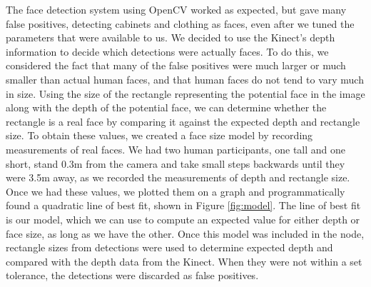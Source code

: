 \documentclass[conference]{IEEEtran}
\begin{document}
The face detection system using OpenCV worked as expected, but gave many false positives, detecting cabinets and clothing as faces, even after we tuned the parameters that were available to us. We decided to use the Kinect's depth information to decide which detections were actually faces. To do this, we considered the fact that many of the false positives were much larger or much smaller than actual human faces, and that human faces do not tend to vary much in size. Using the size of the rectangle representing the potential face in the image along with the depth of the potential face, we can determine whether the rectangle is a real face by comparing it against the expected depth and rectangle size. To obtain these values, we created a face size model by recording measurements of real faces. We had two human participants, one tall and one short, stand 0.3m from the camera and take small steps backwards until they were 3.5m away, as we recorded the measurements of depth and rectangle size. Once we had these values, we plotted them on a graph and programmatically found a quadratic line of best fit, shown in Figure \ref{fig:model}. The line of best fit is our model, which we can use to compute an expected value for either depth or face size, as long as we have the other. Once this model was included in the node, rectangle sizes from detections were used to determine expected depth and compared with the depth data from the Kinect. When they were not within a set tolerance, the detections were discarded as false positives.
\end{document}
